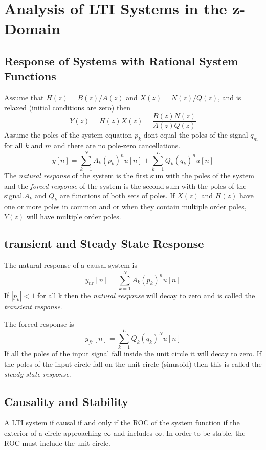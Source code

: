 \documentclass{article} %
\begin{document}
	\section{Analysis of LTI Systems in the z-Domain}
	\subsection{Response of Systems with Rational System Functions}
	Assume that $H(z) = B(z)/A(z)$ and $X(z) = N(z)/Q(z)$, and is relaxed (initial conditions are zero) then
	\begin{equation}
	Y(z) = H(z)X(z) = \frac{B(z)N(z)}{A(z)Q(z)}
	\end{equation}
	Assume the poles of the system equation $p_k$ dont equal the poles of the signal $q_m$ for all $k$ and $m$ and there are no pole-zero cancellations. 
	\begin{equation}
	y[n] = \sum_{k=1}^N A_k(p_k)^nu[n] + \sum_{k=1}^L Q_k(q_k)^n u[n]
	\end{equation}
	The \textit{natural response} of the system is the first sum with the poles of the system and the \textit{forced response} of the system is the second sum with the poles of the signal.$A_k$ and $Q_k$ are functions of both sets of poles. If $X(z)$ and $H(z)$ have one or more poles in common and or when they contain multiple order poles, $Y(z)$ will have multiple order poles.
	
	\subsection{transient and Steady State Response}
	The natural response of a causal system is 
	\begin{equation}
	y_{nr}[n] = \sum_{k=1}^NA_k(p_k)^nu[n]
	\end{equation}
	If $|p_k| < 1$ for all k then the \textit{natural response} will decay to zero and is called the \textit{transient response}.
	
	The forced response is 
	\begin{equation}
	y_{fr}[n] = \sum_{k=1}^L Q_k(q_k)^Nu[n]
	\end{equation}
	If all the poles of the input signal fall inside the unit circle it will decay to zero. If the poles of the input circle fall on the unit circle (sinusoid) then this is called the \textit{steady state response}.
	\subsection{Causality and Stability}
	A LTI system if causal if and only if the ROC of the system function if the exterior of a circle approaching $\infty$ and includes $\infty$. In order to be stable, the ROC must include the unit circle.
\end{document}
